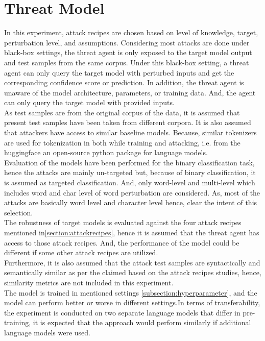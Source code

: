 \documentclass[%
	BCOR=8mm, %
	DIV=12,
	toc=bibliography, %
	toc=listof, %
	oneside, %
	egregdoesnotlikesansseriftitles, %
	]{scrbook}
\begin{document}
\section{Threat Model}
\label{section:threadmodel}
In this experiment, attack recipes are chosen based on level of knowledge, target, perturbation level, and assumptions. Considering most attacks are done under black-box settings, the threat agent is only exposed to the target model output and test samples from the same corpus. Under this black-box setting, a threat agent can only query the target model with perturbed inputs and get the corresponding confidence score or prediction. In addition, the threat agent is unaware of the model architecture, parameters, or training data. And, the agent can only query the target model with provided inputs. \\
As test samples are from the original corpus of the data, it is assumed that present test samples have been taken from different corpora. It is also assumed that attackers have access to similar baseline models. Because, similar tokenizers are used for tokenization in both while training and attacking, i.e. from the huggingface \cite{noauthor_hugging_nodate}  an open-source python package for language models.\\
Evaluation of the models have been performed for the binary classification task, hence the attacks are mainly un-targeted but, because of binary classification, it is assumed as targeted classification. And, only word-level and multi-level which includes word and char level of word perturbation are considered. As, most of the attacks are basically word level and character level hence, clear the intent of this selection.\\
The robustness of target models is evaluated against the four attack recipes mentioned in\ref{section:attackrecipes}, hence it is assumed that the threat agent has access to those attack recipes. And, the performance of the model could be different if some other attack recipes are utilized.\\
 Furthermore, it is also assumed that the attack test samples are syntactically and semantically similar as per the claimed based on the attack recipes studies, hence, similarity metrics are not included in this experiment.\\
 The model is trained in mentioned settings  \ref{subsection:hyperparameter}, and the model can perform better or worse in different settings.In terms of transferability, the experiment is conducted on two separate language models that differ in pre-training, it is expected that the approach would perform similarly if additional language models were used. 
\end{document}
